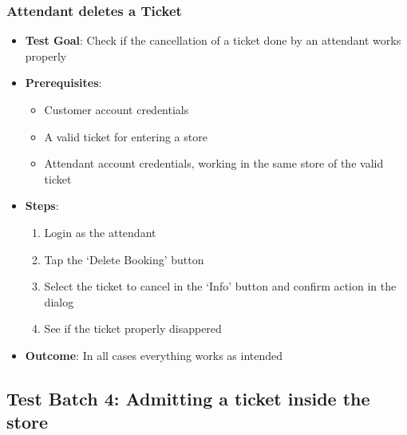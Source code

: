 \subsubsection{Attendant deletes a Ticket}
\begin{itemize}
    \item \textbf{Test Goal}: Check if the cancellation of a ticket done by an attendant works properly
    \item \textbf{Prerequisites}:
          \begin{itemize}
              \item Customer account credentials
              \item A valid ticket for entering a store
              \item Attendant account credentials, working in the same store of the valid ticket
          \end{itemize}
    \item \textbf{Steps}:
          \begin{enumerate}
              \item Login as the attendant
              \item Tap the `Delete Booking' button
              \item Select the ticket to cancel in the `Info' button and confirm action in the dialog
              \item See if the ticket properly disappered
          \end{enumerate}
    \item \textbf{Outcome}: In all cases everything works as intended
\end{itemize}


\subsection{Test Batch 4: Admitting a ticket inside the store}
